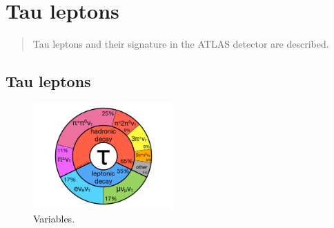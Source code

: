 \chapter[taus][taus]{Tau leptons}

\begin{quote}
  Tau leptons and their signature in the ATLAS detector are described.
\end{quote}

\section{Tau leptons}
\label{sec:taus-theory}

\begin{figure}[tp]
  \centering
  \includegraphics[width=0.48\textwidth]{figures/piecharts/taudecay}
  \caption{Variables.}
  \label{fig:taus-decaypie}
\end{figure}


